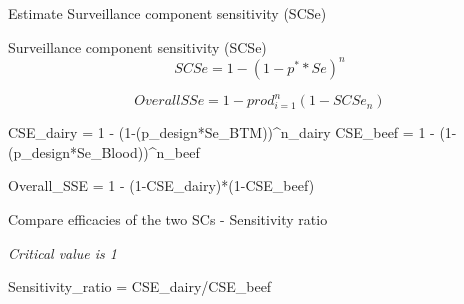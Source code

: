 \documentclass[
  ignorenonframetext,
]{beamer}
\newenvironment{Shaded}{\begin{snugshade}}{\end{snugshade}}
\newcommand{\DecValTok}[1]{\textcolor[rgb]{0.00,0.00,0.81}{#1}}
\newcommand{\NormalTok}[1]{#1}
\newcommand{\OtherTok}[1]{\textcolor[rgb]{0.56,0.35,0.01}{#1}}
\newcommand{\SpecialCharTok}[1]{\textcolor[rgb]{0.00,0.00,0.00}{#1}}
\begin{document}
\begin{frame}[fragile]{Estimate Surveillance component sensitivity
(SCSe)}
\protect\hypertarget{estimate-surveillance-component-sensitivity-scse}{}
\begin{block}{Surveillance component sensitivity (SCSe)}
  \begin{equation}
          SCSe = 1 - (1 - p^**Se)^n
  \end{equation}

  \begin{equation}
          OverallSSe = 1 - prod_{i=1}^{n}(1 - SCSe_n)
  \end{equation}
\end{block}

\begin{Shaded}
\begin{Highlighting}[]
\NormalTok{CSE\_dairy }\OtherTok{=} \DecValTok{1} \SpecialCharTok{{-}}\NormalTok{ (}\DecValTok{1}\SpecialCharTok{{-}}\NormalTok{(p\_design}\SpecialCharTok{*}\NormalTok{Se\_BTM))}\SpecialCharTok{\^{}}\NormalTok{n\_dairy}
\NormalTok{CSE\_beef }\OtherTok{=} \DecValTok{1} \SpecialCharTok{{-}}\NormalTok{ (}\DecValTok{1}\SpecialCharTok{{-}}\NormalTok{(p\_design}\SpecialCharTok{*}\NormalTok{Se\_Blood))}\SpecialCharTok{\^{}}\NormalTok{n\_beef}

\NormalTok{Overall\_SSE }\OtherTok{=} \DecValTok{1} \SpecialCharTok{{-}}\NormalTok{ (}\DecValTok{1}\SpecialCharTok{{-}}\NormalTok{CSE\_dairy)}\SpecialCharTok{*}\NormalTok{(}\DecValTok{1}\SpecialCharTok{{-}}\NormalTok{CSE\_beef)}
\end{Highlighting}
\end{Shaded}

Compare efficacies of the two SCs - Sensitivity ratio

\emph{Critical value is 1}

\begin{Shaded}
\begin{Highlighting}[]
\NormalTok{Sensitivity\_ratio }\OtherTok{=}\NormalTok{ CSE\_dairy}\SpecialCharTok{/}\NormalTok{CSE\_beef}
\end{Highlighting}
\end{Shaded}
\end{frame}
\end{document}
